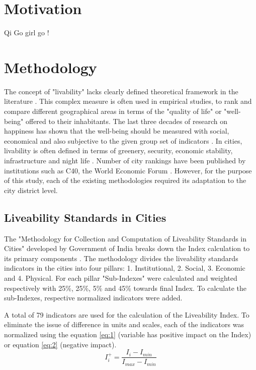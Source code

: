 
\section{Motivation}

Qi  Go girl go !


\section{Methodology}
The concept of "livability" lacks clearly defined theoretical framework in the literature \citep{giap2014new}. This complex measure is often used in empirical studies, to rank and compare different geographical areas in terms of the "quality of life" or "well-being" offered to their inhabitants. The last three decades of research on happiness has shown that the well-being should be measured with social, economical and also subjective to the given group set of indicators \citep{diener1997measuring}. In cities, livability is often defined in terms of greenery, security, economic stability, infrastructure and night life \citep{ unit2011liveanomics}.  
Number of city rankings have been published by institutions such as C40, the World Economic Forum \citep{Okulicz-Kozaryn2013}. However, for the purpose of this study, each of the existing methodologies required its adaptation to the city district level.  

\subsection{Liveability Standards in Cities}

The "Methodology for Collection and Computation of Liveability Standards in Cities" developed by Government of India breaks down the Index calculation 
to its primary components \citep{methodology}.
The methodology divides the liveability standards indicators in the cities into four pillars: 1. Institutional, 2. Social, 3. Economic and 4. Physical. 
For each pillar "Sub-Indexes" were calculated and weighted respectively with 25\%, 25\%, 5\% and 45\% towards final Index. To calculate the sub-Indexes, respective normalized indicators were added.   

A total of 79 indicators are used for the calculation of the Liveability Index. To eliminate the issue of difference in units and scales, each of the indicators was normalized using the equation \ref{eq:1} (variable has positive impact on the Index) or equation \ref{eq:2}  (negative impact).      
\begin{equation}
I_i^+ = \frac{I_i- I_{min}}{I_{max}- I_{min}}
\label{eq:1}
\end{equation}
 
